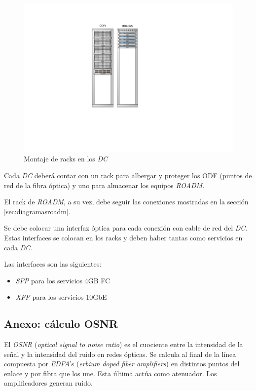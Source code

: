 \begin{figure}[H]
  \centering
  \includegraphics[width=12cm]{Imagenes/racks4.pdf}
  \caption{Montaje de racks en los \emph{DC}}
  \label{fig:racks}
\end{figure}

Cada \emph{DC} deberá contar con un rack para albergar y proteger los
ODF (puntos de red de la fibra óptica) y uno para almacenar los
equipos \emph{ROADM}.

El rack de \emph{ROADM}, a su vez, debe seguir las conexiones
mostradas en la sección \ref{sec:diagramasroadm}.

Se debe colocar una interfaz óptica para cada conexión con cable de
red del \emph{DC}. Estas interfaces se colocan en los racks y deben haber
tantas como servicios en cada \emph{DC}.

Las interfaces son las siguientes:
\begin{itemize}
\item \emph{SFP} para los servicios 4GB FC
\item \emph{XFP} para los servicios 10GbE
\end{itemize}

\subsection{Anexo: cálculo OSNR}
\label{sec:osnr}

El \emph{OSNR} (\emph{optical signal to noise ratio}) es el cuociente
entre la intensidad de la señal y la intensidad del ruido en redes
ópticas. Se calcula al final de la línea compuesta por \emph{EDFA}'s
(\emph{erbium doped fiber amplifiers}) en distintos puntos del enlace
y por fibra que los une. Esta última actúa como atenuador. Los
amplificadores generan ruido.


